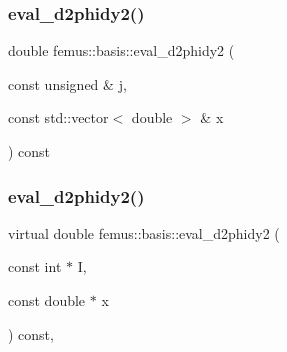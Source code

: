 \mbox{\label{classfemus_1_1basis_abe4127967d317edfc852b0b0432fca98}} 
\subsubsection{\texorpdfstring{eval\+\_\+d2phidy2()}{eval\_d2phidy2()}\hspace{0.1cm}{\footnotesize\ttfamily [1/2]}}
{\footnotesize\ttfamily double femus\+::basis\+::eval\+\_\+d2phidy2 (\begin{DoxyParamCaption}\item[{const unsigned \&}]{j,  }\item[{const std\+::vector$<$ double $>$ \&}]{x }\end{DoxyParamCaption}) const\hspace{0.3cm}{\ttfamily [inline]}}

\mbox{\label{classfemus_1_1basis_a0febb29fe4b32213ff8d6d428f7241cd}} 
\subsubsection{\texorpdfstring{eval\+\_\+d2phidy2()}{eval\_d2phidy2()}\hspace{0.1cm}{\footnotesize\ttfamily [2/2]}}
{\footnotesize\ttfamily virtual double femus\+::basis\+::eval\+\_\+d2phidy2 (\begin{DoxyParamCaption}\item[{const int $\ast$}]{I,  }\item[{const double $\ast$}]{x }\end{DoxyParamCaption}) const\hspace{0.3cm}{\ttfamily [inline]}, {\ttfamily [virtual]}}



